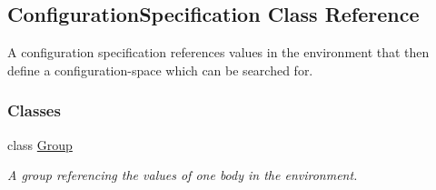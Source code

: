 \hypertarget{classOpenRAVE_1_1ConfigurationSpecification}{
\subsection{ConfigurationSpecification Class Reference}
\label{classOpenRAVE_1_1ConfigurationSpecification}
}


A configuration specification references values in the environment that then define a configuration-\/space which can be searched for.  


\subsubsection*{Classes}
\begin{DoxyCompactItemize}
\item 
class \hyperlink{classOpenRAVE_1_1ConfigurationSpecification_1_1Group}{Group}
\begin{DoxyCompactList}\small\item\em A group referencing the values of one body in the environment. \item\end{DoxyCompactList}\end{DoxyCompactItemize}
